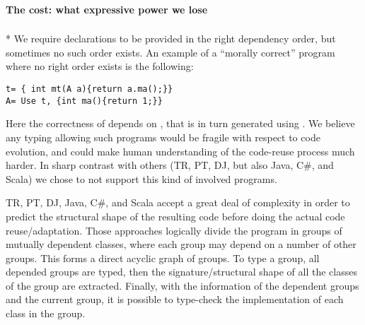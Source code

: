 
\paragraph{The cost: what expressive power we lose}${}_{}$\\*
We require declarations to be provided in the right dependency order, but sometimes no such order exists.
An example of a ``morally correct'' program where no right order exists is the following:
\saveSpace\saveSpace\begin{lstlisting}
t= { int mt(A a){return a.ma();}}
A= Use t, {int ma(){return 1;}}
\end{lstlisting}\saveSpace\saveSpace
Here the correctness of \Q@t@ depends on 
\Q@A@, that is in turn generated using \Q@t@.
We believe any typing allowing such programs would be fragile with respect to code evolution,
and could make human understanding of the code-reuse process much harder.
%
%
In sharp contrast with others (TR, PT, DJ, but also Java, C\#, and Scala)
we chose to not support this kind of involved programs.

TR, PT, DJ, Java, C\#, and Scala
accept a great deal of complexity in order to predict the structural shape of the resulting code before doing the actual code reuse/adaptation.
Those approaches logically divide the program in groups of mutually dependent classes, where each group may depend on a number of other groups.
This forms a direct acyclic graph of groups.
To type a group, all depended groups are typed, then
the signature/structural shape of all
the classes of the group are extracted.
Finally, with the information of the dependent groups and the current group, it is possible to type-check the implementation of each class in the group.




